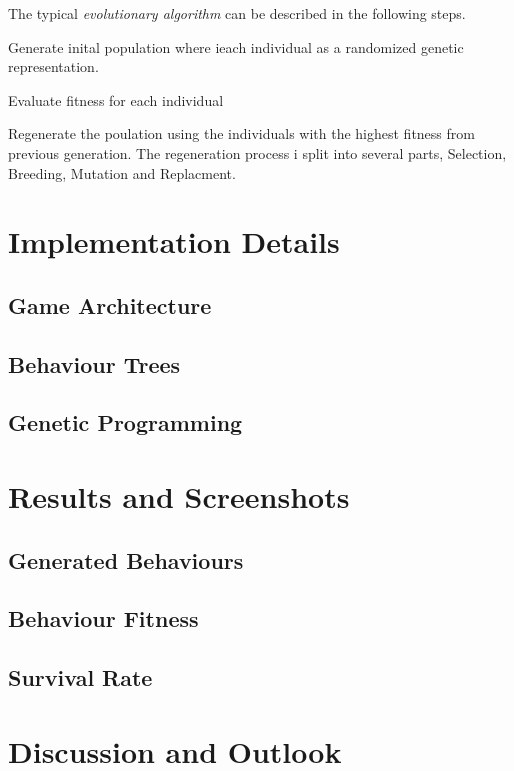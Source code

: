 \documentclass[a4paper, twocolumn]{article}
\begin{document}
	The typical \emph{evolutionary algorithm} can be described in the following steps.

	Generate inital population where ieach individual as a randomized genetic representation.

	Evaluate fitness for each individual

	Regenerate the poulation using the individuals with the highest fitness from previous generation. The regeneration process i split into several parts, Selection, Breeding, Mutation and Replacment.
	
    \section{Implementation Details} \label{sec:implementation_details}



        \subsection{Game Architecture} \label{sec:game_architecture}


        \subsection{Behaviour Trees} \label{sec:behaviour_trees_implementation}


        \subsection{Genetic Programming} \label{sec:genetic_programming_implementation}



    \section{Results and Screenshots} \label{sec:results_and_screenshots}



        \subsection{Generated Behaviours} \label{sec:generated_behaviours}



        \subsection{Behaviour Fitness} \label{sec:behaviour_fitness}



        \subsection{Survival Rate} \label{sec:survival_rate}



    \section{Discussion and Outlook} \label{sec:discussion_and_outlook}
\end{document}
